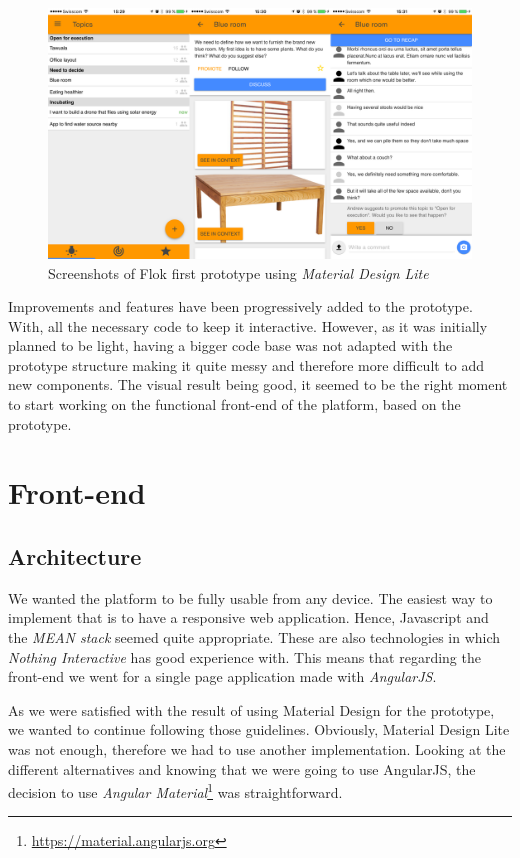 \documentclass[a4paper,12pt, oneside]{article}
\begin{document}
\begin{figure}[!htb]
    \centering
    \includegraphics[width=\textwidth]{images/firstPrototypeScreenshots.png}
    \caption{Screenshots of Flok first prototype using \emph{Material Design Lite}}
    \label{fig.firstPrototypeScreenshots}
\end{figure}

Improvements and features have been progressively added to the prototype.
With, all the necessary code to keep it interactive.
However, as it was initially planned to be light, having a bigger code base was not adapted with the prototype structure making it quite messy and therefore more difficult to add new components.
The visual result being good, it seemed to be the right moment to start working on the functional front-end of the platform, based on the prototype.

\section{Front-end}
\subsection{Architecture}
\label{sec.architecture}
We wanted the platform to be fully usable from any device.
The easiest way to implement that is to have a responsive web application.
Hence, Javascript and the \emph{MEAN stack} seemed quite appropriate.
These are also technologies in which \emph{Nothing Interactive} has good experience with.
This means that regarding the front-end we went for a single page application made with \emph{AngularJS}.

As we were satisfied with the result of using Material Design for the prototype, we wanted to continue following those guidelines.
Obviously, Material Design Lite was not enough, therefore we had to use another implementation.
Looking at the different alternatives and knowing that we were going to use AngularJS, the decision to use \emph{Angular Material}\footnote{\url{https://material.angularjs.org}} was straightforward.
\end{document}
